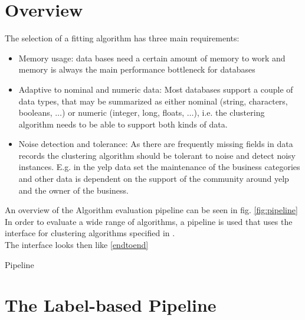 \section{Overview}\label{\positionnumber}
The selection of a fitting algorithm has three main requirements:
\begin{itemize}
    \item Memory usage: data bases need a certain amount of memory to work and memory is always the main performance bottleneck for databases
    \item Adaptive to nominal and numeric data: Most databases support a couple of data types, that may be summarized as either nominal (string, characters, booleans, $\dots$) or numeric (integer, long, floats, $\dots$), i.e. the clustering algorithm needs to be able to support both kinds of data.
    \item Noise detection and tolerance: As there are frequently missing fields in data records the clustering algorithm should be tolerant to noise and detect noisy instances. E.g. in the yelp data set the maintenance of the business categories and other data is dependent on the support of the community around yelp and the owner of the business.
\end{itemize}
An overview of the Algorithm evaluation pipeline can be seen in fig. \ref{fig:pipeline}
In order to evaluate a wide range of algorithms, a pipeline is used that uses the interface for clustering algorithms specified in . \\
The interface looks then like \ref{endtoend}
\begin{algorithm}[htp]
\caption{Pipeline}\label{endtoend}
\end{algorithm}


\section{The Label-based Pipeline}
